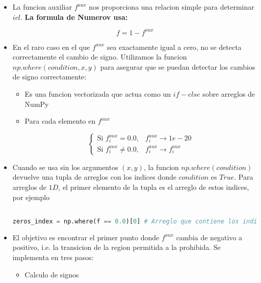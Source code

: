 \documentclass[11pt]{article}
\begin{document}
\begin{itemize}
\item La funcion auxiliar \(f^{aux}\) nos proporciona una relacion simple para determinar \(icl\). \textbf{La formula de Numerov usa:}

\[ f = 1 - f^{aux} \]

\item En el raro caso en el que \(f^{aux}\) sea exactamente igual a cero, no se detecta correctamente el cambio de signo. Utilizamos la funcion \(np.where(condition, x, y)\) para asegurar que se puedan detectar los cambios de signo correctamente:

\begin{itemize}
\item Es una funcion vectorizada que actua como un \(if-else\) sobre arreglos de NumPy

\item Para cada elemento en \(f^{aux}\)

\[\begin{cases}\text{Si } f^{aux}_i = 0.0, & f^{aux}_i \to 1e-20 \\ \text{Si } f^{aux}_{i} \neq 0.0, & f^{aux}_i \to f^{aux}_{i}\end{cases}\]
\end{itemize}

\item Cuando se usa sin los argumentos \((x,y)\), la funcion \(np.where(condition)\) devuelve una tupla de arreglos con los indices donde \(condition\) es \(True\). Para arreglos de \(1D\), el primer elemento de la tupla es el arreglo de estos indices, por ejemplo

\begin{lstlisting}[language=Python,numbers=none]

zeros_index = np.where(f == 0.0)[0] # Arreglo que contiene los indices donde f = 0

\end{lstlisting}

\item El objetivo es encontrar el primer punto donde \(f^{aux}\) cambia de negativo a positivo, i.e. la transicion de la region permitida a la prohibida. Se implementa en tres pasos:

\begin{itemize}
\item Calculo de signos

\begin{lstlisting}[language=Python,numbers=none]


\end{lstlisting}
\end{itemize}
\end{itemize}
\end{document}
